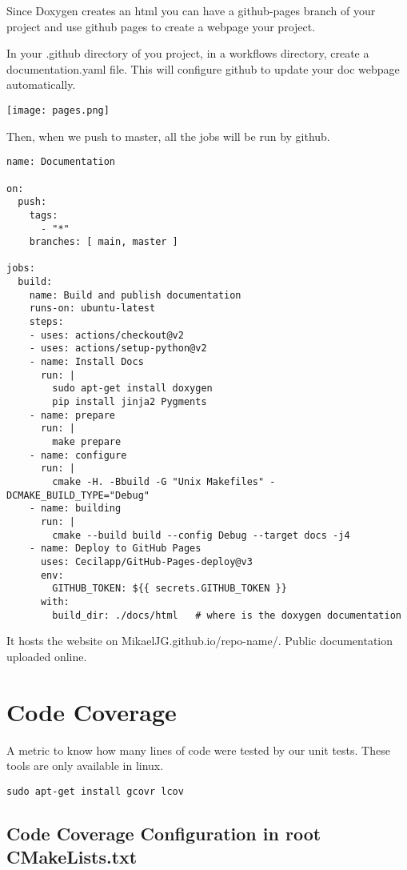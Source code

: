 Since Doxygen creates an html you can have a github-pages branch of your project and
use github pages to create a webpage your project.

In your .github directory of you project, in a workflows directory, create a documentation.yaml file. 
This will configure github to update your doc webpage automatically.


\begin{center}
    \texttt{[image: pages.png]}
\end{center}

Then, when we push to master, all the jobs will be run by github.

\begin{verbatim}
name: Documentation

on:
  push:
    tags:
      - "*"
    branches: [ main, master ]

jobs:
  build:
    name: Build and publish documentation
    runs-on: ubuntu-latest
    steps:
    - uses: actions/checkout@v2
    - uses: actions/setup-python@v2
    - name: Install Docs
      run: |
        sudo apt-get install doxygen
        pip install jinja2 Pygments
    - name: prepare
      run: |
        make prepare
    - name: configure
      run: |
        cmake -H. -Bbuild -G "Unix Makefiles" -DCMAKE_BUILD_TYPE="Debug"
    - name: building
      run: |
        cmake --build build --config Debug --target docs -j4
    - name: Deploy to GitHub Pages
      uses: Cecilapp/GitHub-Pages-deploy@v3
      env:
        GITHUB_TOKEN: ${{ secrets.GITHUB_TOKEN }}
      with:
        build_dir: ./docs/html   # where is the doxygen documentation
\end{verbatim}

It hosts the website on MikaelJG.github.io/repo-name/. Public documentation uploaded online.

\section{Code Coverage}

A metric to know how many lines of code were tested by our unit tests.
These tools are only available in linux.

\begin{verbatim}
sudo apt-get install gcovr lcov
\end{verbatim}

\subsection{Code Coverage Configuration in root CMakeLists.txt}

